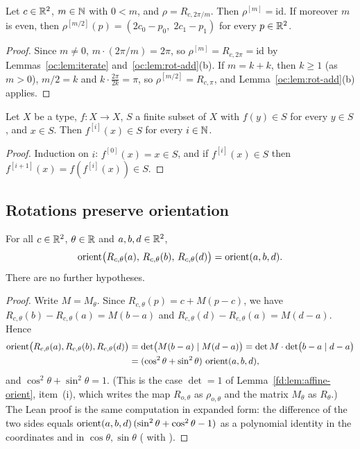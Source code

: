 \begin{corollary}\label{oc:cor:period}
Let $c\in\mathbb R^2$, $m\in\mathbb N$ with $0<m$, and $\rho=R_{c,2\pi/m}$. Then $\rho^{[m]}=\mathrm{id}$. If moreover
$m$ is even, then $\rho^{[m/2]}(p)=(2c_0-p_0,\;2c_1-p_1)$ for every $p\in\mathbb R^2$.
\end{corollary}
\begin{proof}
Since $m\ne0$, $m\cdot(2\pi/m)=2\pi$, so $\rho^{[m]}=R_{c,2\pi}=\mathrm{id}$ by
Lemmas~\ref{oc:lem:iterate} and~\ref{oc:lem:rot-add}(b). If $m=k+k$, then $k\ge1$ (as $m>0$), $m/2=k$
and $k\cdot\frac{2\pi}{2k}=\pi$, so $\rho^{[m/2]}=R_{c,\pi}$, and Lemma~\ref{oc:lem:rot-add}(b) applies.
\end{proof}

\begin{lemma}\label{oc:lem:iter-mem}
Let $X$ be a type, $f:X\to X$, $S$ a finite subset of $X$ with $f(y)\in S$ for every $y\in S$, and $x\in
S$. Then $f^{[i]}(x)\in S$ for every $i\in\mathbb N$.
\end{lemma}
\begin{proof}
Induction on $i$: $f^{[0]}(x)=x\in S$, and if $f^{[i]}(x)\in S$ then $f^{[i+1]}(x)=f(f^{[i]}(x))\in S$.
\end{proof}

\subsection{Rotations preserve orientation}\label{oc:sub:rot}

\begin{lemma}\label{oc:lem:rot-inv}
For all $c\in\mathbb R^2$, $\theta\in\mathbb R$ and $a,b,d\in\mathbb R^2$,
\[\operatorname{orient}\bigl(R_{c,\theta}(a),\,R_{c,\theta}(b),\,R_{c,\theta}(d)\bigr)=\operatorname{orient}(a,b,d).\]
There are no further hypotheses.
\end{lemma}
\begin{proof}
Write $M=M_\theta$. Since $R_{c,\theta}(p)=c+M(p-c)$, we have $R_{c,\theta}(b)-R_{c,\theta}(a)=M(b-a)$
and $R_{c,\theta}(d)-R_{c,\theta}(a)=M(d-a)$. Hence
\begin{align*}
\operatorname{orient}\bigl(R_{c,\theta}(a),R_{c,\theta}(b),R_{c,\theta}(d)\bigr)
 &=\det\bigl(M(b-a)\mid M(d-a)\bigr)=\det M\cdot\det\bigl(b-a\mid d-a\bigr)\\
 &=(\cos^2\theta+\sin^2\theta)\,\operatorname{orient}(a,b,d),
\end{align*}
and $\cos^2\theta+\sin^2\theta=1$. (This is the case $\det=1$ of Lemma~\ref{fd:lem:affine-orient},
item~(i), which writes the map $R_{o,\theta}$ as $\rho_{o,\theta}$ and the matrix $M_\theta$ as
$R_\theta$.) The Lean proof is the same computation in expanded form: the difference of the two sides equals
$\operatorname{orient}(a,b,d)\,(\sin^2\theta+\cos^2\theta-1)$ as a polynomial identity in the coordinates and in
$\cos\theta,\sin\theta$ ( with ).
\end{proof}

